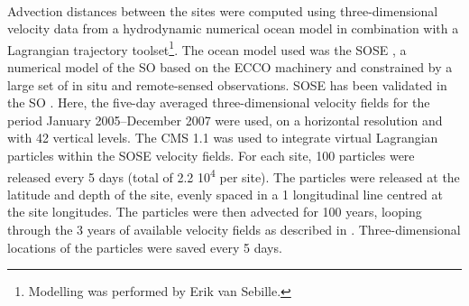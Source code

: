 \smallskip\\
Advection distances between the sites were computed using three-dimensional velocity data from a hydrodynamic numerical ocean model in combination with a Lagrangian trajectory toolset\footnote{Modelling was performed by Erik van Sebille.}.
The ocean model used was the \ac{SOSE} \cite{Mazloff:2010et}, a numerical model of the \ac{SO} based on the \ac{ECCO} machinery \cite{Wunsch:2007iq} and constrained by a large set of in situ and remote-sensed observations.
\ac{SOSE} has been validated in the \ac{SO} \cite{Cerovecki:hu, Firing:2011dp}. 
Here, the five-day averaged three-dimensional velocity fields for the period January 2005--December 2007 were used, on a \textdegree{} horizontal resolution and with 42 vertical levels.
The \ac{CMS} \cite{Paris:2013fs} 1.1 was used to integrate virtual Lagrangian particles within the \ac{SOSE} velocity fields.
For each site, 100 particles were released every 5 days (total of 2.2 \texttimes{} 10\textsuperscript{4} per site).
The particles were released at the latitude and depth of the site, evenly spaced in a 1\textdegree{} longitudinal line centred at the site longitudes.
The particles were then advected for 100 years, looping through the 3 years of available velocity fields as described in \citet{vanSebille:2012hh}.
Three-dimensional locations of the particles were saved every 5 days.

